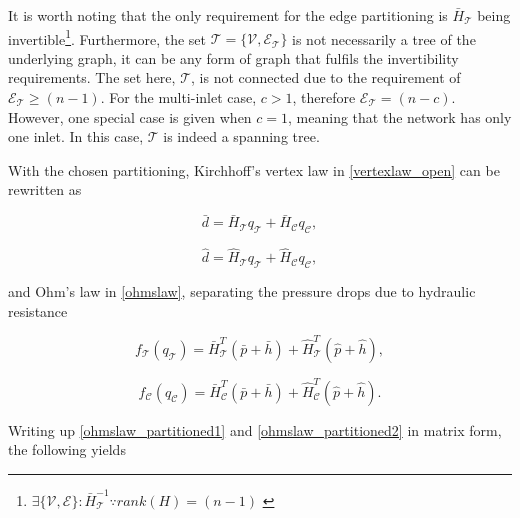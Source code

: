 It is worth noting that the only requirement for the edge partitioning is $\bar{H}_{\mathcal{T}}$ being invertible\footnote{$\exists \{\mathcal{V}, \mathcal{E} \} : \bar{H}^{-1}_{\mathcal{T}} \because rank(H) = (n-1) $ \cite{deo2017graph} }. Furthermore, the set $\mathcal{T} = \{\mathcal{V}, \mathcal{E_{\mathcal{T}}} \}$ is not necessarily a tree of the underlying graph, it can be any form of graph that fulfils the invertibility requirements. The set here, $\mathcal{T}$, is not connected due to the requirement of $\mathcal{E_{\mathcal{T}}} \geq (n-1)$. For the multi-inlet case, $c > 1$, therefore $\mathcal{E_{\mathcal{T}}} = (n-c)$.  However, one special case is given when $c = 1$, meaning that the network has only one inlet. In this case, $\mathcal{T}$ is indeed a spanning tree. 

With the chosen partitioning, Kirchhoff's vertex law in \eqref{vertexlaw_open} can be rewritten as

\begin{equation}
  \label{vertexlaw_partitioned1}
  \bar{d} = \bar{H}_{\mathcal{T}} q_{\mathcal{T}} + \bar{H}_{\mathcal{C}} q_{\mathcal{C}},
\end{equation}

\begin{equation}
  \label{vertexlaw_partitioned2}
  \hat{d} = \hat{H}_{\mathcal{T}} q_{\mathcal{T}} + \hat{H}_{\mathcal{C}} q_{\mathcal{C}},
\end{equation}

and Ohm's law in \eqref{ohmslaw}, separating the pressure drops due to hydraulic resistance

\begin{equation}
  \label{ohmslaw_partitioned1}
  f_{\mathcal{T}}(q_\mathcal{T}) = \bar{H}^T_{\mathcal{T}} (\bar{p} + \bar{h}) + \hat{H}^T_{\mathcal{T}} (\hat{p} + \hat{h}),
\end{equation}

\begin{equation}
  \label{ohmslaw_partitioned2}
  f_{\mathcal{C}}(q_\mathcal{C}) = \bar{H}^T_{\mathcal{C}} (\bar{p} + \bar{h}) + \hat{H}^T_{\mathcal{C}} (\hat{p} + \hat{h}).
\end{equation}

Writing up \eqref{ohmslaw_partitioned1} and \eqref{ohmslaw_partitioned2} in matrix form, the following yields

